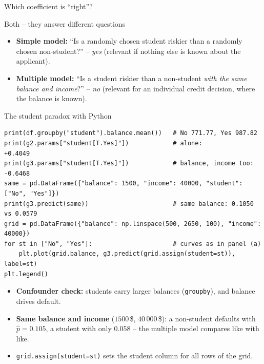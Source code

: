 \documentclass[aspectratio=169,11pt]{beamer}
\begin{document}
\begin{frame}{Which coefficient is ``right''?}
  \begin{block}{Both -- they answer different questions}
    \begin{itemize}\setlength{\itemsep}{3pt}
      \item \textbf{Simple model:} ``Is a randomly chosen student riskier
            than a randomly chosen non-student?'' -- \emph{yes} (relevant if
            nothing else is known about the applicant).
      \item \textbf{Multiple model:} ``Is a student riskier than a
            non-student \emph{with the same balance and income}?'' --
            \emph{no} (relevant for an individual credit decision, where the
            balance is known).
    \end{itemize}
  \end{block}
\end{frame}

\begin{frame}[fragile]{The student paradox with Python}
\begin{lstlisting}
print(df.groupby("student").balance.mean())   # No 771.77, Yes 987.82
print(g2.params["student[T.Yes]"])            # alone:              +0.4049
print(g3.params["student[T.Yes]"])            # balance, income too: -0.6468
same = pd.DataFrame({"balance": 1500, "income": 40000, "student": ["No", "Yes"]})
print(g3.predict(same))                       # same balance: 0.1050 vs 0.0579
grid = pd.DataFrame({"balance": np.linspace(500, 2650, 100), "income": 40000})
for st in ["No", "Yes"]:                      # curves as in panel (a)
    plt.plot(grid.balance, g3.predict(grid.assign(student=st)), label=st)
plt.legend()
\end{lstlisting}
  \begin{itemize}\setlength{\itemsep}{3pt}
    \item \textbf{Confounder check:} students carry larger balances
          (\texttt{groupby}), and balance drives default.
    \item \textbf{Same balance and income} ($1500$\,\$, $40\,000$\,\$): a
          non-student defaults with $\hat p=0.105$, a student with only
          $0.058$ -- the multiple model compares like with like.
    \item \texttt{grid.assign(student=st)} sets the student column for all
          rows of the grid.
  \end{itemize}
\end{frame}
\end{document}
